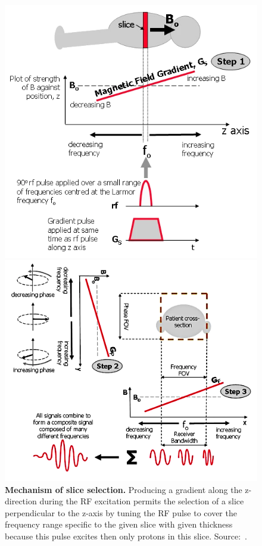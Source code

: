 \begin{figure}[thb]
    \centering
    \begin{minipage}{.43\textwidth}
        \centering
        \includegraphics[width=\linewidth]{images/slice_selection.png}
        \caption{\textbf{Mechanism of slice selection.} Producing a gradient along the z-direction during the RF excitation permits the selection of a slice perpendicular to the z-axis by tuning the RF pulse to cover the frequency range specific to the given slice with given thickness because this pulse excites then only protons in this slice. Source:~\cite{ridgway_cardiovascular_2010}.}
        \label{fig:slice_selection}
    \end{minipage}%
    \hspace{0.03\textwidth}
    \begin{minipage}{0.53\textwidth}
        \centering
        \includegraphics[width=\linewidth]{images/phase_and_freq_encoding.png}

\end{minipage}
\end{figure}
